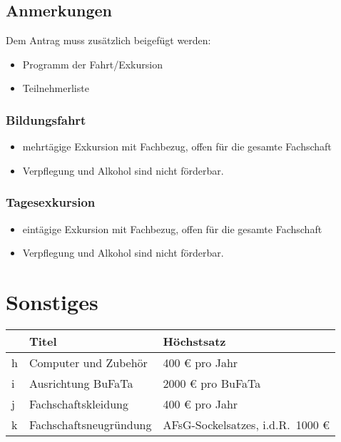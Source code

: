 \documentclass{article}
\begin{document}
    \subsection{Anmerkungen}
    Dem Antrag muss zusätzlich beigefügt werden:
        \begin{itemize}
            \item Programm der Fahrt/Exkursion
            \item Teilnehmerliste
        \end{itemize}
        \subsubsection{Bildungsfahrt}
            \begin{itemize}
                \item  mehrtägige Exkursion mit Fachbezug, offen für die gesamte Fachschaft
                \item Verpflegung und Alkohol sind nicht förderbar.
            \end{itemize}
        
        \subsubsection{Tagesexkursion}
            \begin{itemize}
                \item eintägige Exkursion mit Fachbezug, offen für die gesamte Fachschaft
                \item Verpflegung und Alkohol sind nicht förderbar.
            \end{itemize}
            

    
\section{Sonstiges}
    \setlength\extrarowheight{2mm} \sffamily
    \begin{tabular}{l||L{6cm}|L{7cm}}
        &\textbf{Titel} & \textbf{Höchstsatz}\\[1mm] \hline \hline
        h&
        Computer und Zubehör &
        400 € pro Jahr \\[1mm] \hline
         

         
        i&
        Ausrichtung BuFaTa  &
        2000 € pro BuFaTa \\[1mm] \hline
        
        j&
        Fachschaftskleidung&
        400 € pro Jahr \\[1mm] \hline
         
        k&
        Fachschaftsneugründung &
        AFsG-Sockelsatzes, i.d.R.\ 1000 € \\[1mm]
    \end{tabular}
    \rmfamily
\end{document}
